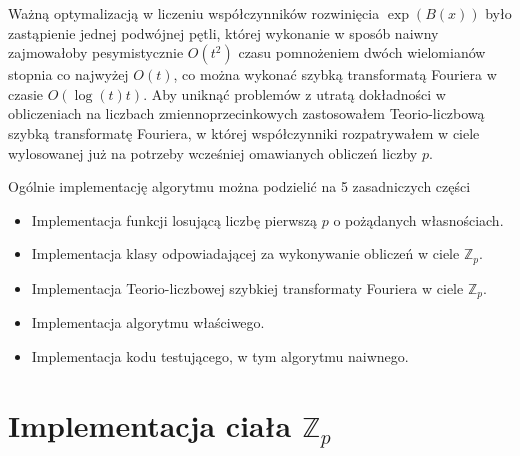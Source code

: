 \documentclass{article}
\begin{document}

Ważną optymalizacją w liczeniu współczynników rozwinięcia $\exp(B(x))$ było zastąpienie jednej podwójnej pętli, 
której wykonanie w sposób naiwny zajmowałoby pesymistycznie $O(t^2)$ czasu pomnożeniem dwóch wielomianów stopnia co 
najwyżej $O(t)$, co można wykonać szybką 
transformatą Fouriera w czasie $O(\log(t)t)$. Aby uniknąć problemów z utratą dokładności w obliczeniach na liczbach 
zmiennoprzecinkowych zastosowałem Teorio-liczbową szybką transformatę Fouriera, w której współczynniki rozpatrywałem w ciele 
wylosowanej już na potrzeby wcześniej omawianych obliczeń 
liczby $p$.

Ogólnie implementację algorytmu można podzielić na 5 zasadniczych części
\begin{itemize}
  \item Implementacja funkcji losującą liczbę pierwszą $p$ o pożądanych własnościach.
  \item Implementacja klasy odpowiadającej za wykonywanie obliczeń w ciele $\mathbb{Z}_p$.
  \item Implementacja Teorio-liczbowej szybkiej transformaty Fouriera w ciele $\mathbb{Z}_p$.
  \item Implementacja algorytmu właściwego.
  \item Implementacja kodu testującego, w tym algorytmu naiwnego.
\end{itemize}




\section{Implementacja ciała $ \mathbb{Z}_p$}
\end{document}

